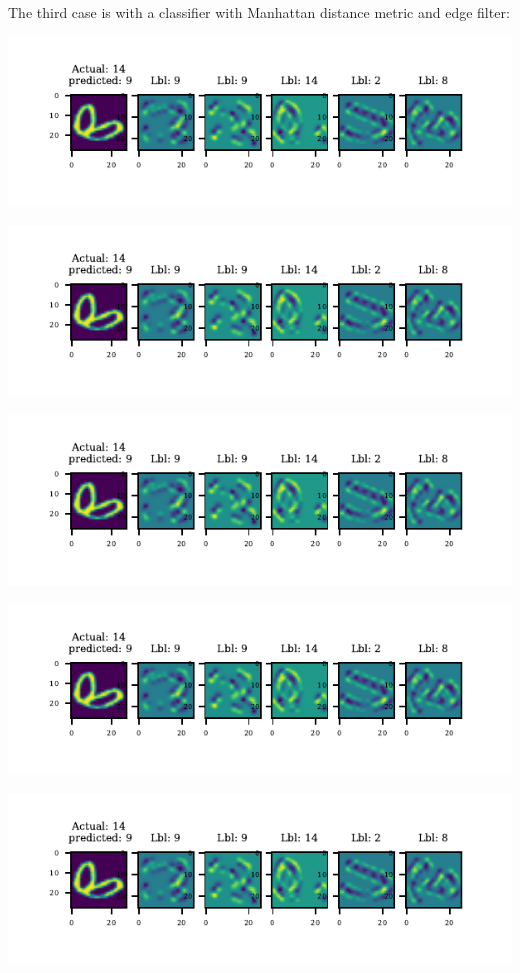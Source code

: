 \documentclass[11pt]{article}
\begin{document}
The third case is with a classifier with Manhattan distance metric and edge filter:

\includegraphics{figures/1i[3]_miss_classified_0.pdf}

\includegraphics{figures/1i[3]_miss_classified_0.pdf}

\includegraphics{figures/1i[3]_miss_classified_0.pdf}

\includegraphics{figures/1i[3]_miss_classified_0.pdf}

\includegraphics{figures/1i[3]_miss_classified_0.pdf}
\end{document}
